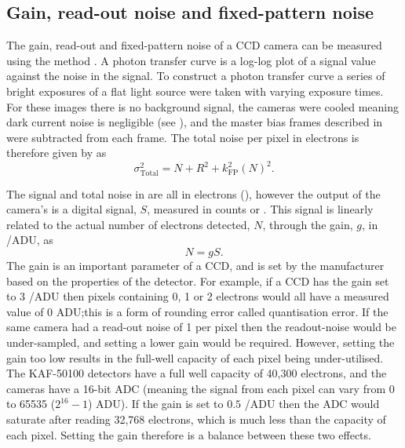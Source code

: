 \subsection{Gain, read-out noise and fixed-pattern noise}
\label{sec:ptc}
\begin{colsection}

The gain, read-out and fixed-pattern noise of a CCD camera can be measured using the  method \citep{CCDs, PTC}. A photon transfer curve is a log-log plot of a signal value against the noise in the signal. To construct a photon transfer curve a series of bright exposures of a flat light source were taken with varying exposure times. For these images there is no background signal, the cameras were cooled meaning dark current noise is negligible (see ), and the master bias frames described in  were subtracted from each frame. The total noise per pixel in electrons is therefore given by  as
%
\begin{equation}
    \sigma_\text{Total}^2 = N + R^2 + k_\text{FP}^2{(N)}^2.
    \label{eq:noise_2}
\end{equation}

The signal and total noise in  are all in electrons (\elec), however the output of the camera's  is a digital signal, $S$, measured in counts or . This signal is linearly related to the actual number of electrons detected, $N$, through the gain, $g$, in \elec/ADU, as
%
\begin{equation}
    N = g S.
    \label{eq:gain}
\end{equation}
%
The gain is an important parameter of a CCD, and is set by the manufacturer based on the properties of the detector. For example, if a CCD has the gain set to 3 \elec/ADU then pixels containing 0, 1 or 2 electrons would all have a measured value of 0 ADU;\@ this is a form of rounding error called quantisation error. If the same camera had a read-out noise of 1 \elec{} per pixel then the readout-noise would be under-sampled, and setting a lower gain would be required. However, setting the gain too low results in the full-well capacity of each pixel being under-utilised. The KAF-50100 detectors have a full well capacity of 40,300 electrons, and the cameras have a 16-bit ADC (meaning the signal from each pixel can vary from 0 to 65535 ($2^{16}-1$) ADU). If the gain is set to $0.5$ \elec/ADU then the ADC would saturate after reading 32,768 electrons, which is much less than the capacity of each pixel. Setting the gain therefore is a balance between these two effects.


\end{colsection}
